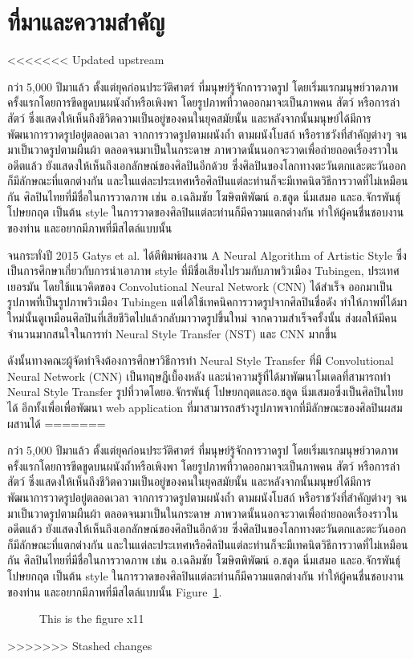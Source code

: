 \documentclass[12pt,oneside,openright,a4paper]{cpe-thai-project}
\begin{document}
\section{ที่มาและความสำคัญ}

<<<<<<< Updated upstream
\par\setlength{\parindent}{5ex}กว่า 5,000 ปีมาแล้ว ตั้งแต่ยุคก่อนประวัติศาตร์ ที่มนุษย์รู้จักการวาดรูป โดยเริ่มแรกมนุษย์วาดภาพครั้งแรกโดยการขีดขูดบนผนังถ้ำหรือเพิงพา โดยรูปภาพที่วาดออกมาจะเป็นภาพคน สัตว์ หรือการล่าสัตว์ ซึ่งแสดงให้เห็นถึงชีวิตความเป็นอยู่ของคนในยุคสมัยนั้น และหลังจากนั้นมนุษย์ได้มีการพัฒนาการวาดรูปอยู่ตลอดเวลา จากการวาดรูปตามผนังถ้ำ ตามผนังโบสถ์ หรือราชวังที่สำคัญต่างๆ จนมาเป็นวาดรูปตามผืนผ้า ตลอดจนมาเป็นในกระดาษ ภาพวาดนั้นนอกจะวาดเพื่อถ่ายถอดเรื่องราวในอดีตแล้ว ยังแสดงให้เห็นถึงเอกลักษณ์ของศิลปินอีกด้วย ซึ่งศิลปินของโลกทางตะวันตกและตะวันออกก็มีลักษณะที่แตกต่างกัน และในแต่ละประเทศหรือศิลปินแต่ละท่านก็จะมีเทคนิตวิธีการวาดที่ไม่เหมือนกัน ศิลปินไทยที่มีชื่อในการวาดภาพ เช่น อ.เฉลิมชัย โฆษิตพิพัฒน์ อ.ชลูด นิ่มเสมอ และอ.จักรพันธุ์ โปษยกฤต เป็นต้น style ในการวาดของศิลปินแต่ละท่านก็มีความแตกต่างกัน ทำให้ผู้คนชื่นชอบงานของท่าน และอยากมีภาพที่มีสไตล์แบบนั้น 
\par\setlength{\parindent}{5ex}จนกระทั่งปี 2015 Gatys et al. ได้ตีพิมพ์ผลงาน A Neural Algorithm of Artistic Style ซึ่งเป็นการศึกษาเกี่ยวกับการนำเอาภาพ style ที่มีชื่อเสียงไปรวมกับภาพวิวเมือง Tubingen, ประเทศเยอรมัน โดยใช้แนวคิดของ Convolutional Neural Network (CNN)  ได้สำเร็จ ออกมาเป็นรูปภาพที่เป็นรูปภาพวิวเมือง Tubingen แต่ได้ใช้เทคนิคการวาดรูปจากศิลปินชื่อดัง ทำให้ภาพที่ได้มาใหม่นั้นดูเหมือนศิลปินที่เสียชีวิตไปแล้วกลับมาวาดรูปขึ้นใหม่ จากความสำเร็จครั้งนั้น ส่งผลให้มีคนจำนวนมากสนใจในการทำ Neural Style Transfer (NST) และ CNN มากขึ้น
\par\setlength{\parindent}{5ex}ดังนั้นทางคณะผู้จัดทำจึงต้องการศึกษาวิธีการทำ Neural Style Transfer ที่มี Convolutional Neural Network (CNN) เป็นทฤษฎีเบื้องหลัง และนำความรู้ที่ได้มาพัฒนาโมเดลที่สามารถทำ Neural Style Transfer รูปที่วาดโดยอ.จักรพันธุ์ โปษยกฤตและอ.ชลูด นิ่มเสมอซึ่งเป็นศิลปินไทยได้ อีกทั้งเพื่อเพื่อพัฒนา web application ที่มาสามารถสร้างรูปภาพจากที่มีลักษณะของศิลปินผสมผสานได้
=======
\par\setlength{\parindent}{5ex}กว่า 5,000 ปีมาแล้ว ตั้งแต่ยุคก่อนประวัติศาตร์ ที่มนุษย์รู้จักการวาดรูป โดยเริ่มแรกมนุษย์วาดภาพครั้งแรกโดยการขีดขูดบนผนังถ้ำหรือเพิงพา โดยรูปภาพที่วาดออกมาจะเป็นภาพคน สัตว์ หรือการล่าสัตว์ ซึ่งแสดงให้เห็นถึงชีวิตความเป็นอยู่ของคนในยุคสมัยนั้น และหลังจากนั้นมนุษย์ได้มีการพัฒนาการวาดรูปอยู่ตลอดเวลา จากการวาดรูปตามผนังถ้ำ ตามผนังโบสถ์ หรือราชวังที่สำคัญต่างๆ จนมาเป็นวาดรูปตามผืนผ้า ตลอดจนมาเป็นในกระดาษ ภาพวาดนั้นนอกจะวาดเพื่อถ่ายถอดเรื่องราวในอดีตแล้ว ยังแสดงให้เห็นถึงเอกลักษณ์ของศิลปินอีกด้วย ซึ่งศิลปินของโลกทางตะวันตกและตะวันออกก็มีลักษณะที่แตกต่างกัน และในแต่ละประเทศหรือศิลปินแต่ละท่านก็จะมีเทคนิตวิธีการวาดที่ไม่เหมือนกัน ศิลปินไทยที่มีชื่อในการวาดภาพ เช่น อ.เฉลิมชัย โฆษิตพิพัฒน์ อ.ชลูด นิ่มเสมอ และอ.จักรพันธุ์ โปษยกฤต เป็นต้น style ในการวาดของศิลปินแต่ละท่านก็มีความแตกต่างกัน ทำให้ผู้คนชื่นชอบงานของท่าน และอยากมีภาพที่มีสไตล์แบบนั้น Figure~\ref{fig:x1}.
\begin{figure}[!h]
\caption{This is the figure x11}\label{fig:x1}
\end{figure}
>>>>>>> Stashed changes
\end{document}
